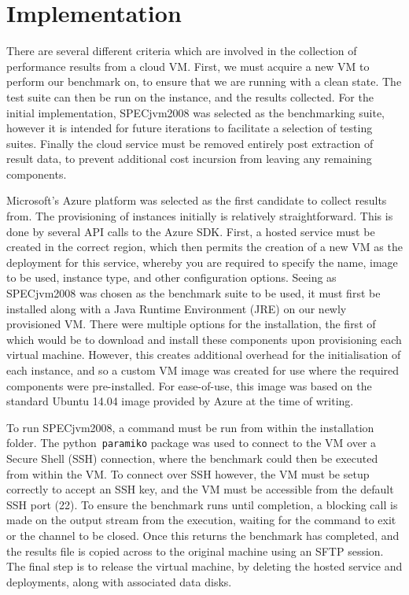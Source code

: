 \documentclass{llncs}
\begin{document}

\section{Implementation}\label{sec:implementation}

There are several different criteria which are involved in the collection of performance results from a cloud VM. First, we must acquire a new VM to perform our benchmark on, to ensure that we are running with a clean state. The test suite can then be run on the instance, and the results collected. For the initial implementation, SPECjvm2008 was selected as the benchmarking suite, however it is intended for future iterations to facilitate a selection of testing suites. Finally the cloud service must be removed entirely post extraction of result data, to prevent additional cost incursion from leaving any remaining components.

Microsoft's Azure platform was selected as the first candidate to collect results from. The provisioning of instances initially is relatively straightforward. This is done by several API calls to the Azure SDK. First, a hosted service must be created in the correct region, which then permits the creation of a new VM as the deployment for this service, whereby you are required to specify the name, image to be used, instance type, and other configuration options. Seeing as SPECjvm2008 was chosen as the benchmark suite to be used, it must first be installed along with a Java Runtime Environment (JRE) on our newly provisioned VM. There were multiple options for the installation, the first of which would be to download and install these components upon provisioning each virtual machine. However, this creates additional overhead for the initialisation of each instance, and so a custom VM image \cite{azurevmimage} was created for use where the required components were pre-installed. For ease-of-use, this image was based on the standard Ubuntu 14.04 image provided by Azure at the time of writing.

To run SPECjvm2008, a command must be run from within the installation folder. The python~\texttt{paramiko} package was used to connect to the VM over a Secure Shell (SSH) connection, where the benchmark could then be executed from within the VM. To connect over SSH however, the VM must be setup correctly to accept an SSH key, and the VM must be accessible from the default SSH port (22). To ensure the benchmark runs until completion, a blocking call is made on the output stream from the execution, waiting for the command to exit or the channel to be closed. Once this returns the benchmark has completed, and the results file is copied across to the original machine using an SFTP session. The final step is to release the virtual machine, by deleting the hosted service and deployments, along with associated data disks.
\end{document}

